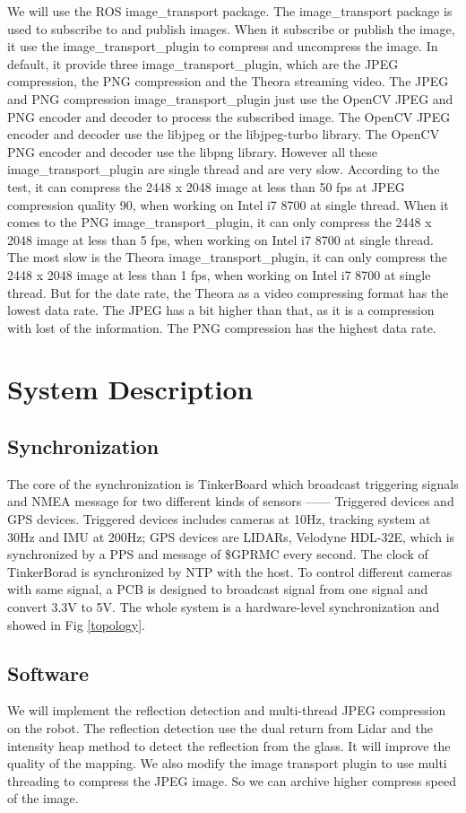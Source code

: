 \documentclass[conference]{IEEEtran}
\begin{document}
We will use the ROS image\_transport package. The image\_transport package is used to subscribe to and publish images. When it subscribe or publish the image, it use the image\_transport\_plugin to compress and uncompress the image. In default, it provide three image\_transport\_plugin, which are the JPEG compression, the PNG compression and the Theora streaming video. The JPEG and PNG compression image\_transport\_plugin just use the OpenCV JPEG and PNG encoder and decoder to process the subscribed image. The OpenCV JPEG encoder and decoder use the libjpeg or the libjpeg-turbo library. The OpenCV PNG encoder and decoder use the libpng library. However all these image\_transport\_plugin are single thread and are very slow. According to the test, it can compress the 2448 x 2048 image at less than 50 fps at JPEG compression quality 90, when working on Intel i7 8700 at single thread. When it comes to the PNG image\_transport\_plugin, it can only compress the 2448 x 2048 image at less than 5 fps, when working on Intel i7 8700 at single thread. The most slow is the Theora image\_transport\_plugin, it can only compress the 2448 x 2048 image at less than 1 fps, when working on Intel i7 8700 at single thread. But for the date rate, the Theora as a video compressing format has the lowest data rate. The JPEG has a bit higher than that, as it is a compression with lost of the information. The PNG compression has the highest data rate.

\section{System Description}
\subsection{Synchronization}
	The core of the synchronization is TinkerBoard which broadcast triggering signals and NMEA message for two different kinds of sensors ------ Triggered devices and GPS devices. Triggered devices includes cameras at 10Hz, tracking system at 30Hz and IMU at 200Hz; GPS devices are LIDARs, Velodyne HDL-32E, which is synchronized by a PPS and message of \$GPRMC every second. The clock of TinkerBorad is synchronized by NTP with the host. To control different cameras with same signal, a PCB is designed to broadcast signal from one signal and convert 3.3V to 5V. The whole system is a hardware-level synchronization and showed in Fig \ref{topology}. 
\subsection{Software}
   We will implement the reflection detection and multi-thread JPEG compression on the robot. The reflection detection\cite{zhao2019mapping} use the dual return from Lidar and the intensity heap method to detect the reflection from the glass. It will improve the quality of the mapping. We also modify the image transport plugin to use multi threading to compress the JPEG image. So we can archive higher compress speed of the image.
\end{document}
